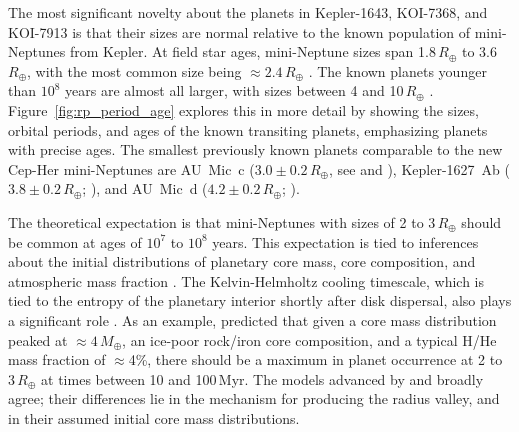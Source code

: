 \documentclass[12pt,twocolumn]{aastex63}
\begin{document}
The most significant novelty about the planets in Kepler-1643,
KOI-7368, and KOI-7913 is that their sizes are normal relative to the
known population of mini-Neptunes from Kepler.  At field star ages,
mini-Neptune sizes span 1.8\,$R_\oplus$ to 3.6\,$R_\oplus$, with the
most common size being $\approx 2.4\,R_\oplus$
\citep[][Figure~7]{Fulton_et_al_2017}.  The known planets younger than
$10^8$ years are almost all larger, with sizes between 4 and
10$\,R_\oplus$
\citep{Mann_K2_33b_2016,David_et_al_2016,benatti_possibly_2019,david_four_2019,newton_tess_2019,rizzuto_tess_2020,bouma_cluster_2020,mann_toi1227_2022}.
Figure~\ref{fig:rp_period_age} explores this in more detail by showing
the sizes, orbital periods, and ages of the known transiting planets,
emphasizing planets with precise ages.  The smallest previously known
planets comparable to the new Cep-Her mini-Neptunes are AU~Mic~c
($3.0\pm0.2\,R_\oplus$, see \citealt{martioli_aumicbc_2021} and
\citealt{gilbert_flares_2022}), Kepler-1627~Ab ($3.8\pm0.2\,R_\oplus$;
\citealt{bouma_kep1627_2022}), and AU~Mic~d ($4.2\pm0.2\,R_\oplus$;
\citealt{plavchan_planet_2020}).

The theoretical expectation is that mini-Neptunes with sizes of 2 to
3\,$R_\oplus$ should be common at ages of $10^7$ to $10^8$ years.
This expectation is tied to inferences about the initial distributions
of planetary core mass, core composition, and atmospheric mass
fraction \citep{owen_evaporation_2017}.  The Kelvin-Helmholtz cooling
timescale, which is tied to the entropy of the planetary interior
shortly after disk dispersal, also plays a significant role
\citep{owen_constraining_2020}.  As an example,
\citet{rogers_unveiling_2021} predicted that given a core mass
distribution peaked at $\approx$$4$\,$M_\oplus$, an ice-poor rock/iron
core composition, and a typical H/He mass fraction of $\approx$4\%,
there should be a maximum in planet occurrence at 2 to 3\,$R_\oplus$
at times between 10 and 100\,Myr.  The models advanced by
\citet{gupta_signatures_2020} and \citet{lee_primordial_2021} broadly agree;
their differences lie in the mechanism for producing the radius
valley, and in their assumed initial core mass distributions. 
\end{document}
